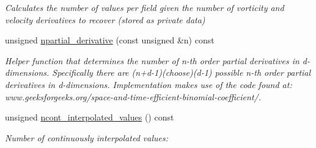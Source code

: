 \begin{DoxyCompactItemize}
\begin{DoxyCompactList}\small\item\em Calculates the number of values per field given the number of vorticity and velocity derivatives to recover (stored as private data) \end{DoxyCompactList}\item 
unsigned \hyperlink{classVorticityRecoveryHelpers_1_1RecoveryHelper_ae89029d89e2497fb767027bd44a6fa68}{npartial\+\_\+derivative} (const unsigned \&n) const
\begin{DoxyCompactList}\small\item\em Helper function that determines the number of n-\/th order partial derivatives in d-\/dimensions. Specifically there are (n+d-\/1)(choose)(d-\/1) possible n-\/th order partial derivatives in d-\/dimensions. Implementation makes use of the code found at\+: www.\+geeksforgeeks.\+org/space-\/and-\/time-\/efficient-\/binomial-\/coefficient/. \end{DoxyCompactList}\item 
unsigned \hyperlink{classVorticityRecoveryHelpers_1_1RecoveryHelper_a552a9daee2699b515a3b81113f800b54}{ncont\+\_\+interpolated\+\_\+values} () const
\begin{DoxyCompactList}\small\item\em Number of continuously interpolated values\+: \end{DoxyCompactList}\end{DoxyCompactItemize}
